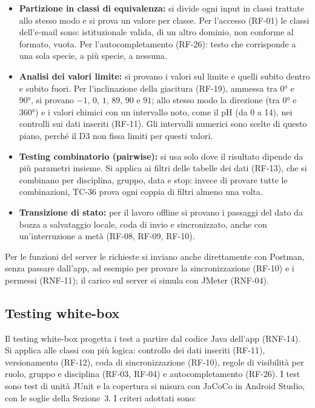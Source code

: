 \begin{itemize}
    \item \textbf{Partizione in classi di equivalenza:} si divide ogni input in classi trattate allo stesso modo e si prova un valore per classe. Per l'accesso (RF-01) le classi dell'e-mail sono: istituzionale valida, di un altro dominio, non conforme al formato, vuota. Per l'autocompletamento (RF-26): testo che corrisponde a una sola specie, a più specie, a nessuna.
    \item \textbf{Analisi dei valori limite:} si provano i valori sul limite e quelli subito dentro e subito fuori. Per l'inclinazione della giacitura (RF-19), ammessa tra 0° e 90°, si provano $-1$, $0$, $1$, $89$, $90$ e $91$; allo stesso modo la direzione (tra 0° e 360°) e i valori chimici con un intervallo noto, come il pH (da 0 a 14), nei controlli sui dati inseriti (RF-11). Gli intervalli numerici sono scelte di questo piano, perché il D3 non fissa limiti per questi valori.
    \item \textbf{Testing combinatorio (pairwise):} si usa solo dove il risultato dipende da più parametri insieme. Si applica ai filtri delle tabelle dei dati (RF-13), che si combinano per disciplina, gruppo, data e stop: invece di provare tutte le combinazioni, TC-36 prova ogni coppia di filtri almeno una volta.
    \item \textbf{Transizione di stato:} per il lavoro offline si provano i passaggi del dato da bozza a salvataggio locale, coda di invio e sincronizzato, anche con un'interruzione a metà (RF-08, RF-09, RF-10).
\end{itemize}

Per le funzioni del server le richieste si inviano anche direttamente con Postman, senza passare dall'app, ad esempio per provare la sincronizzazione (RF-10) e i permessi (RNF-11); il carico sul server si simula con JMeter (RNF-04).

\subsection{Testing white-box}

Il testing white-box progetta i test a partire dal codice Java dell'app (RNF-14). Si applica alle classi con più logica: controllo dei dati inseriti (RF-11), versionamento (RF-12), coda di sincronizzazione (RF-10), regole di visibilità per ruolo, gruppo e disciplina (RF-03, RF-04) e autocompletamento (RF-26). I test sono test di unità JUnit e la copertura si misura con JaCoCo in Android Studio, con le soglie della Sezione~3. I criteri adottati sono:

